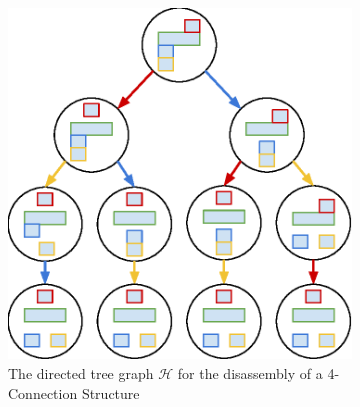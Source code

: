 \documentclass{article}
\begin{document}
\begin{figure}[h!]
    \centering
    \begin{subfigure}[b]{0.45\textwidth}
        \centering
        \includegraphics{figs/SubassemblyTreeGeneration.eps}
        \caption{The directed tree graph $\mathcal{H}$ for the disassembly of a 4-Connection Structure}
        \label{fig: treeGen}
    \end{subfigure}
    \hfill
    \begin{subfigure}[b]{0.45\textwidth}
        \centering

\end{subfigure}
\end{figure}
\end{document}
